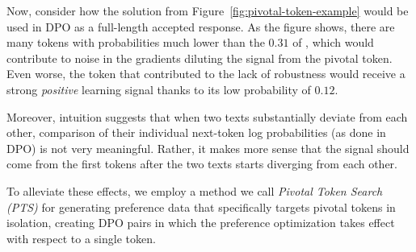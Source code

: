 Now, consider how the solution from Figure~\ref{fig:pivotal-token-example} would be used in DPO as a full-length accepted response. As the figure shows, there are many tokens with probabilities much lower than the $0.31$ of , which would contribute to noise in the gradients diluting the signal from the pivotal token. Even worse, the token  that contributed to the lack of robustness would receive a strong \emph{positive} learning signal thanks to its low probability of $0.12$. 

Moreover, intuition suggests that when two texts substantially deviate from each other, comparison of their individual next-token log probabilities (as done in DPO) is not very meaningful. Rather, it makes more sense that the signal should come from the first tokens after the two texts starts diverging from each other. 

To alleviate these effects, we employ a method we call \emph{Pivotal Token Search (PTS)} for generating preference data that specifically targets pivotal tokens in isolation, creating DPO pairs in which the preference optimization takes effect with respect to a single token.

